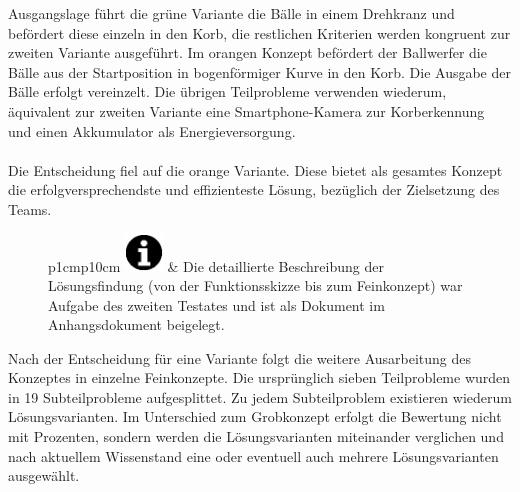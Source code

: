 Ausgangslage führt die grüne Variante die Bälle in einem Drehkranz und befördert diese einzeln
in den Korb, die restlichen Kriterien werden kongruent zur zweiten Variante ausgeführt. Im
orangen Konzept befördert der Ballwerfer die Bälle aus der Startposition in bogenförmiger 
Kurve in den Korb. Die Ausgabe der Bälle erfolgt vereinzelt. Die übrigen Teilprobleme verwenden
wiederum, äquivalent zur zweiten Variante eine Smartphone-Kamera zur Korberkennung und einen
Akkumulator als Energieversorgung.\\
\\
Die Entscheidung fiel auf die orange Variante. Diese bietet als gesamtes Konzept die
erfolgversprechendste und effizienteste Lösung, bezüglich der Zielsetzung des Teams.

\begin{figure}[h!]
	\centering
    \begin{tabular}{p{1cm}p{10cm}}
    		{\includegraphics[width=1cm]{Enddokumentation/Varianten/Bilder/info_icon.png}}
    	 & Die detaillierte Beschreibung der Lösungsfindung (von der Funktionsskizze bis zum
    	 Feinkonzept) war Aufgabe des zweiten Testates und ist als Dokument im Anhangsdokument beigelegt. \\
    \end{tabular}
\end{figure}

\noindent Nach der Entscheidung für eine Variante folgt die weitere Ausarbeitung des Konzeptes
in einzelne Feinkonzepte. Die ursprünglich sieben Teilprobleme wurden in 19 Subteilprobleme
aufgesplittet. Zu jedem Subteilproblem existieren wiederum Lösungsvarianten. Im Unterschied 
zum Grobkonzept erfolgt die Bewertung nicht mit Prozenten, sondern werden die Lösungsvarianten
miteinander verglichen und nach aktuellem Wissenstand eine oder eventuell auch mehrere
Lösungsvarianten ausgewählt. 


